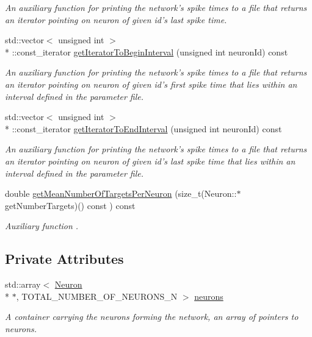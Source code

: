 \begin{DoxyCompactItemize}
\begin{DoxyCompactList}\small\item\em An auxiliary function for printing the network's spike times to a file that returns an iterator pointing on neuron of given id's last spike time. \end{DoxyCompactList}\item 
std\-::vector$<$ unsigned int $>$\\*
\-::const\-\_\-iterator \hyperlink{classNetwork_a704f86bb8fc175c204aa63575116b33a}{get\-Iterator\-To\-Begin\-Interval} (unsigned int neuron\-Id) const 
\begin{DoxyCompactList}\small\item\em An auxiliary function for printing the network's spike times to a file that returns an iterator pointing on neuron of given id's first spike time that lies within an interval defined in the parameter file. \end{DoxyCompactList}\item 
std\-::vector$<$ unsigned int $>$\\*
\-::const\-\_\-iterator \hyperlink{classNetwork_aa8c6b4953e1c5655d891859ffd936848}{get\-Iterator\-To\-End\-Interval} (unsigned int neuron\-Id) const 
\begin{DoxyCompactList}\small\item\em An auxiliary function for printing the network's spike times to a file that returns an iterator pointing on neuron of given id's last spike time that lies within an interval defined in the parameter file. \end{DoxyCompactList}\item 
double \hyperlink{classNetwork_a1d598a5f615aa488f3e52666739da1ca}{get\-Mean\-Number\-Of\-Targets\-Per\-Neuron} (size\-\_\-t(Neuron\-::$\ast$get\-Number\-Targets)() const ) const 
\begin{DoxyCompactList}\small\item\em Auxiliary function . \end{DoxyCompactList}\end{DoxyCompactItemize}
\subsection*{Private Attributes}
\begin{DoxyCompactItemize}
\item 
\hypertarget{classNetwork_a11dac461892218c2653fccdb761a99aa}{std\-::array$<$ \hyperlink{classNeuron}{Neuron} \\*
$\ast$, T\-O\-T\-A\-L\-\_\-\-N\-U\-M\-B\-E\-R\-\_\-\-O\-F\-\_\-\-N\-E\-U\-R\-O\-N\-S\-\_\-\-N $>$ \hyperlink{classNetwork_a11dac461892218c2653fccdb761a99aa}{neurons}}\label{classNetwork_a11dac461892218c2653fccdb761a99aa}

\begin{DoxyCompactList}\small\item\em A container carrying the neurons forming the network, an array of pointers to neurons. \end{DoxyCompactList}\end{DoxyCompactItemize}


